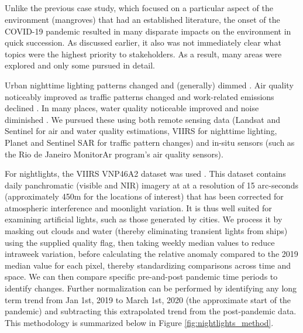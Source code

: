 \subsection{} \label{sec:vida-evdt-method}


\subsubsection{} \label{sec:vida-evdt-e-method}

Unlike the previous case study, which focused on a particular aspect of the environment (mangroves) that had an established literature, the onset of the COVID-19 pandemic resulted in many disparate impacts on the environment in quick succession. As discussed earlier, it also was not immediately clear what topics were the highest priority to stakeholders. As a result, many areas were explored and only some pursued in detail.

Urban nighttime lighting patterns changed and (generally) dimmed \cite{elvidgeDimmingLightsChina2020}. Air quality noticeably improved as traffic patterns changed and work-related emissions declined \cite{isaifanDramaticImpactCoronavirus2020}. In many places, water quality noticeable improved and noise diminished \cite{aroraCoronavirusLockdownHelped2020}. We pursued these using both remote sensing data (Landsat and Sentinel for air and water quality estimations, VIIRS for nighttime lighting, Planet and Sentinel SAR for traffic pattern changes) and in-situ sensors (such as the Rio de Janeiro MonitorAr program's air quality sensors).

For nightlights, the VIIRS VNP46A2 dataset was used \cite{romanNASABlackMarble2018}. This dataset contains daily panchromatic (visible and NIR) imagery at at a resolution of 15 arc-seconds (approximately 450m for the locations of interest) that has been corrected for atmospheric interference and moonlight variation. It is thus well suited for examining artificial lights, such as those generated by cities. We process it by masking out clouds and water (thereby eliminating transient lights from ships) using the supplied quality flag, then taking weekly median values to reduce intraweek variation, before calculating the relative anomaly compared to the 2019 median value for each pixel, thereby standardizing comparisons across time and space. We can then compare specific pre-and-post pandemic time periods to identify changes. Further normalization can be performed by identifying any long term trend from Jan 1st, 2019 to March 1st, 2020 (the approximate start of the pandemic) and subtracting this extrapolated trend from the post-pandemic data. This methodology is summarized below in Figure \ref{fig:nightlights_method}.

